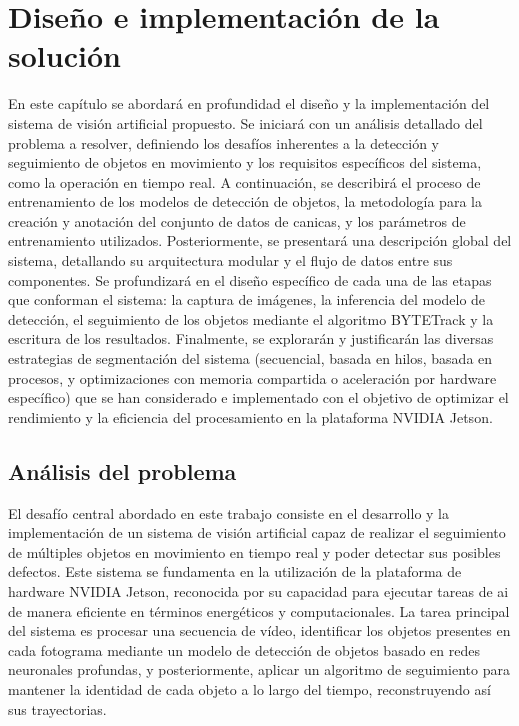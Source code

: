 \documentclass[11pt,spanish,listoffigures,listoftables]{tfgetsinf}
\begin{document}




\chapter{Diseño e implementación de la solución}\label{chap:diseno_e_implementacion}

En este capítulo se abordará en profundidad el diseño y la implementación del sistema de visión artificial propuesto. Se iniciará con un análisis detallado del problema a resolver, definiendo los desafíos inherentes a la detección y seguimiento de objetos en movimiento y los requisitos específicos del sistema, como la operación en tiempo real. A continuación, se describirá el proceso de entrenamiento de los modelos de detección de objetos, la metodología para la creación y anotación del conjunto de datos de canicas, y los parámetros de entrenamiento utilizados. Posteriormente, se presentará una descripción global del sistema, detallando su arquitectura modular y el flujo de datos entre sus componentes. Se profundizará en el diseño específico de cada una de las etapas que conforman el sistema: la captura de imágenes, la inferencia del modelo de detección, el seguimiento de los objetos mediante el algoritmo BYTETrack y la escritura de los resultados. Finalmente, se explorarán y justificarán las diversas estrategias de segmentación del sistema (secuencial, basada en hilos, basada en procesos, y optimizaciones con memoria compartida o aceleración por hardware específico) que se han considerado e implementado con el objetivo de optimizar el rendimiento y la eficiencia del procesamiento en la plataforma NVIDIA Jetson.



\section{Análisis del problema}\label{sec:analisis_problema}

El desafío central abordado en este trabajo consiste en el desarrollo y la implementación de un sistema de visión artificial capaz de realizar el seguimiento de múltiples objetos en movimiento en tiempo real y poder detectar sus posibles defectos. Este sistema se fundamenta en la utilización de la plataforma de hardware NVIDIA Jetson, reconocida por su capacidad para ejecutar tareas de \gls{ai} de manera eficiente en términos energéticos y computacionales. La tarea principal del sistema es procesar una secuencia de vídeo, identificar los objetos presentes en cada fotograma mediante un modelo de detección de objetos basado en redes neuronales profundas, y posteriormente, aplicar un algoritmo de seguimiento para mantener la identidad de cada objeto a lo largo del tiempo, reconstruyendo así sus trayectorias.
\end{document}
